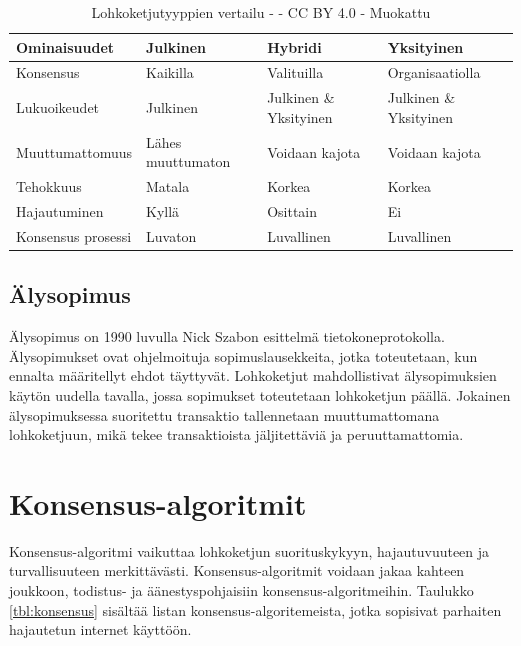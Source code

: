 \documentclass[utf8,bachelor]{gradu3}
\begin{document}
\begin{table}[ht]\centering
  \begin{tabular}{llll}
    \toprule
    Ominaisuudet & Julkinen & Hybridi & Yksityinen \\
    \midrule
    Konsensus & Kaikilla & Valituilla & Organisaatiolla \\
    Lukuoikeudet & Julkinen & Julkinen \& Yksityinen & Julkinen \& Yksityinen \\
    Muuttumattomuus & Lähes muuttumaton & Voidaan kajota & Voidaan kajota \\
    Tehokkuus & Matala & Korkea & Korkea \\
    Hajautuminen & Kyllä & Osittain & Ei \\
    Konsensus prosessi & Luvaton & Luvallinen & Luvallinen \\
    \bottomrule
  \end{tabular}
  \caption{Lohkoketjutyyppien vertailu - \cite{zarrin2021blockchain} - CC BY 4.0 - Muokattu}
  \label{tbl:cmdchange}
\end{table}

\section{Älysopimus}
Älysopimus on 1990 luvulla Nick Szabon esittelmä tietokoneprotokolla. Älysopimukset ovat ohjelmoituja sopimuslausekkeita, jotka toteutetaan, kun ennalta määritellyt ehdot täyttyvät.
Lohkoketjut mahdollistivat älysopimuksien käytön uudella tavalla, jossa sopimukset toteutetaan lohkoketjun päällä.
Jokainen älysopimuksessa suoritettu transaktio tallennetaan muuttumattomana lohkoketjuun, mikä tekee transaktioista jäljitettäviä ja peruuttamattomia. 


\chapter{Konsensus-algoritmit}\label{Konsensus}


Konsensus-algoritmi vaikuttaa lohkoketjun suorituskykyyn, hajautuvuuteen ja turvallisuuteen merkittävästi.
Konsensus-algoritmit voidaan jakaa kahteen joukkoon, todistus- ja äänestyspohjaisiin konsensus-algoritmeihin. 
Taulukko \ref{tbl:konsensus} sisältää listan konsensus-algoritemeista, jotka sopisivat parhaiten hajautetun internet käyttöön. 
\end{document}
